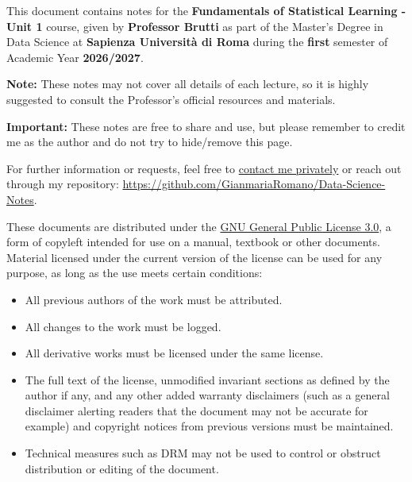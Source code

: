 \documentclass{report}
\begin{document}
\begin{tcolorbox}[colback=gray!5!white, colframe=gray!75!black, title=Disclaimer]
    This document contains notes for the \textbf{Fundamentals of Statistical Learning - Unit 1} course, given by \textbf{Professor Brutti} as part of the Master’s Degree in Data Science at \textbf{Sapienza Università di Roma} during the \textbf{first} semester of Academic Year \textbf{2026/2027}.
    
    \smallskip
    \textbf{Note: }These notes may not cover all details of each lecture, so it is highly suggested to consult the Professor's official resources and materials. 
    
    \smallskip
    \textbf{Important: }These notes are free to share and use, but please remember to credit me as the author and do not try to hide/remove this page.
\end{tcolorbox}

\begin{tcolorbox}[colback=gray!5!white, colframe=gray!75!black, title=Contacts]
    For further information or requests, feel free to \href{https://t.me/toritosenso}{contact me privately} or reach out through my repository: \href{https://github.com/GianmariaRomano/Data-Science-Notes}{https://github.com/GianmariaRomano/Data-Science-Notes}.
\end{tcolorbox}

\begin{tcolorbox}[colback=gray!5!white, colframe=gray!75!black, title=License]
    These documents are distributed under the \href{https://www.gnu.org/licenses/gpl-3.0.en.html}{GNU General Public License 3.0}, a form of copyleft intended for use on a manual, textbook or other documents. Material licensed under the current version of the license can be used for any purpose, as long as the use meets certain conditions:
    \begin{itemize}
        \item All previous authors of the work must be attributed.
        \item All changes to the work must be logged.
        \item All derivative works must be licensed under the same license.
        \item The full text of the license, unmodified invariant sections as defined by the author if any, and any other added warranty disclaimers (such as a general disclaimer alerting readers that the document may not be accurate for example) and copyright notices from previous versions must be maintained.
        \item Technical measures such as DRM may not be used to control or obstruct distribution or editing of the document.
    \end{itemize}
\end{tcolorbox}
\end{document}

